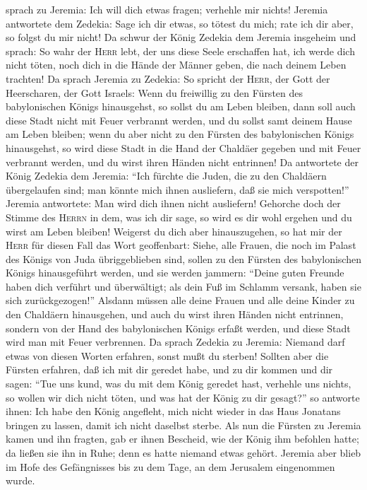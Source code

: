 sprach zu Jeremia: Ich will dich etwas fragen; verhehle mir nichts!
 Jeremia antwortete dem Zedekia: Sage ich dir etwas, so
tötest du mich; rate ich dir aber, so folgst du mir nicht!
 Da schwur der König Zedekia dem Jeremia insgeheim und
sprach: So wahr der \textsc{Herr} lebt, der uns diese Seele erschaffen
hat, ich werde dich nicht töten, noch dich in die Hände der Männer
geben, die nach deinem Leben trachten!  Da sprach Jeremia
zu Zedekia: So spricht der \textsc{Herr}, der Gott der Heerscharen, der
Gott Israels: Wenn du freiwillig zu den Fürsten des babylonischen Königs
hinausgehst, so sollst du am Leben bleiben, dann soll auch diese Stadt
nicht mit Feuer verbrannt werden, und du sollst samt deinem Hause am
Leben bleiben;  wenn du aber nicht zu den Fürsten des
babylonischen Königs hinausgehst, so wird diese Stadt in die Hand der
Chaldäer gegeben und mit Feuer verbrannt werden, und du wirst ihren
Händen nicht entrinnen!  Da antwortete der König Zedekia
dem Jeremia: ``Ich fürchte die Juden, die zu den Chaldäern übergelaufen
sind; man könnte mich ihnen ausliefern, daß sie mich verspotten!''
 Jeremia antwortete: Man wird dich ihnen nicht
ausliefern! Gehorche doch der Stimme des \textsc{Herrn} in dem, was ich
dir sage, so wird es dir wohl ergehen und du wirst am Leben bleiben!
 Weigerst du dich aber hinauszugehen, so hat mir der
\textsc{Herr} für diesen Fall das Wort geoffenbart: 
Siehe, alle Frauen, die noch im Palast des Königs von Juda
übriggeblieben sind, sollen zu den Fürsten des babylonischen Königs
hinausgeführt werden, und sie werden jammern: ``Deine guten Freunde
haben dich verführt und überwältigt; als dein Fuß im Schlamm versank,
haben sie sich zurückgezogen!''  Alsdann müssen alle
deine Frauen und alle deine Kinder zu den Chaldäern hinausgehen, und
auch du wirst ihren Händen nicht entrinnen, sondern von der Hand des
babylonischen Königs erfaßt werden, und diese Stadt wird man mit Feuer
verbrennen.  Da sprach Zedekia zu Jeremia: Niemand darf
etwas von diesen Worten erfahren, sonst mußt du sterben! 
Sollten aber die Fürsten erfahren, daß ich mit dir geredet habe, und zu
dir kommen und dir sagen: ``Tue uns kund, was du mit dem König geredet
hast, verhehle uns nichts, so wollen wir dich nicht töten, und was hat
der König zu dir gesagt?'' so antworte ihnen:  Ich habe
den König angefleht, mich nicht wieder in das Haus Jonatans bringen zu
lassen, damit ich nicht daselbst sterbe.  Als nun die
Fürsten zu Jeremia kamen und ihn fragten, gab er ihnen Bescheid, wie der
König ihm befohlen hatte; da ließen sie ihn in Ruhe; denn es hatte
niemand etwas gehört.  Jeremia aber blieb im Hofe des
Gefängnisses bis zu dem Tage, an dem Jerusalem eingenommen wurde.


